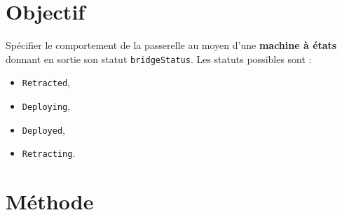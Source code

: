 \documentclass[11pt,a4paper]{report}
\begin{document}
\section*{Objectif}
Spécifier le comportement de la passerelle au moyen d’une \textbf{machine à états} donnant en sortie son statut \texttt{bridgeStatus}.  
Les statuts possibles sont :
\begin{itemize}
  \item \texttt{Retracted},
  \item \texttt{Deploying},
  \item \texttt{Deployed},
  \item \texttt{Retracting}.
\end{itemize}

\section*{Méthode}
\end{document}

